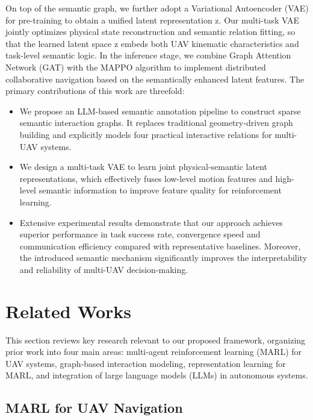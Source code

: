 \documentclass[conference]{IEEEtran}
\begin{document}
On top of the semantic graph, we further adopt a Variational Autoencoder (VAE) for pre-training to obtain a unified latent representation z. Our multi-task VAE jointly optimizes physical state reconstruction and semantic relation fitting, so that the learned latent space z embeds both UAV kinematic characteristics and task-level semantic logic. In the inference stage, we combine Graph Attention Network (GAT) with the MAPPO algorithm to implement distributed collaborative navigation based on the semantically enhanced latent features.
The primary contributions of this work are threefold:
\begin{itemize}
    \item We propose an LLM-based semantic annotation pipeline to construct sparse semantic interaction graphs. It replaces traditional geometry-driven graph building and explicitly models four practical interactive relations for multi-UAV systems.
    \item We design a multi-task VAE to learn joint physical-semantic latent representations, which effectively fuses low-level motion features and high-level semantic information to improve feature quality for reinforcement learning.
    \item Extensive experimental results demonstrate that our approach achieves superior performance in task success rate, convergence speed and communication efficiency compared with representative baselines. Moreover, the introduced semantic mechanism significantly improves the interpretability and reliability of multi-UAV decision-making.
\end{itemize}

\section{Related Works}
This section reviews key research relevant to our proposed framework, organizing prior work into four main areas: multi‑agent reinforcement learning (MARL) for UAV systems, graph‑based interaction modeling, representation learning for MARL, and integration of large language models (LLMs) in autonomous systems.

\subsection{MARL for UAV Navigation}
\end{document}

